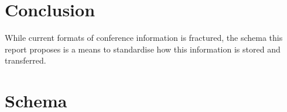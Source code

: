 \documentclass{article}
\begin{document}
\section{Conclusion}
While current formats of conference information is fractured, the schema this report proposes is a means to standardise how this information is stored and transferred.




\onecolumn
\appendix
\section{Schema}
% 

\end{document}
